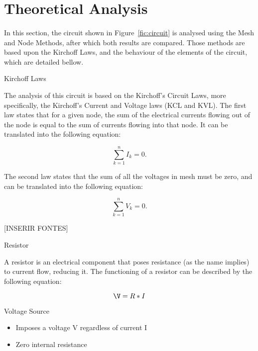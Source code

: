 \section{Theoretical Analysis}
\label{sec:analysis}

\paragraph{} In this section, the circuit shown in Figure~\ref{fic:circuit} is analysed using the Mesh and Node Methods, after which both results are compared.
Those methods are based upon the Kirchoff Laws, and the behaviour of the elements of the circuit, which are detailed bellow.

Kirchoff Laws

The analysis of this circuit is based on the Kirchoff's Circuit Laws, more specifically, the Kirchoff's Current and Voltage laws (KCL and KVL). The first law states that
 for a given node, the sum of the electrical currents flowing out of the node is equal to the sum of currents flowing into that node. 
It can be translated into the following equation:

\begin{equation}
	\sum_{k = 1}^n I_k = 0.
	\label{eq:kcl}
\end{equation}

The second law states that the sum of all the voltages in mesh must be zero, and can be translated into the following equation:

\begin{equation}
	\sum_{k = 1}^n V_k = 0.
	\label{eq:kvl}
\end{equation}

[INSERIR FONTES]

Resistor

A resistor is an electrical component that poses resistance (as the name implies) to current flow, reducing it. The functioning of a resistor can be described
 by the following equation:

\begin{equation}
	\V = R * I
	\label{eq:kvl}
\end{equation}

Voltage Source

\begin{itemize}
	\item Imposes a voltage V regardless of current I
	\item Zero internal resistance
\end{itemize}

